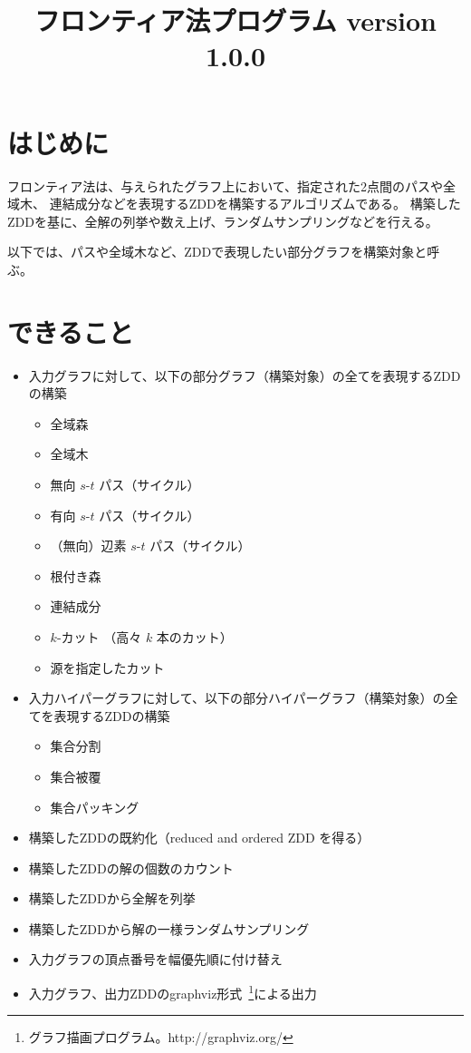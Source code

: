 \documentclass{jsarticle}
\title{フロンティア法プログラム version 1.0.0}
\begin{document}
\maketitle

\section{はじめに}

フロンティア法は、与えられたグラフ上において、指定された2点間のパスや全域木、
連結成分などを表現するZDDを構築するアルゴリズムである。
構築したZDDを基に、全解の列挙や数え上げ、ランダムサンプリングなどを行える。

以下では、パスや全域木など、ZDDで表現したい部分グラフを構築対象と呼ぶ。

\section{できること}

\begin{itemize}
\item 入力グラフに対して、以下の部分グラフ（構築対象）の全てを表現するZDDの構築
\begin{itemize}
\item 全域森
\item 全域木
\item 無向 $s$-$t$ パス（サイクル）
\item 有向 $s$-$t$ パス（サイクル）
\item （無向）辺素 $s$-$t$ パス（サイクル）
\item 根付き森
\item 連結成分
\item $k$-カット （高々 $k$ 本のカット）
\item 源を指定したカット
\end{itemize}
\item 入力ハイパーグラフに対して、以下の部分ハイパーグラフ（構築対象）の全てを表現するZDDの構築
\begin{itemize}
\item 集合分割
\item 集合被覆
\item 集合パッキング
\end{itemize}
\item 構築したZDDの既約化（reduced and ordered ZDD を得る）
\item 構築したZDDの解の個数のカウント
\item 構築したZDDから全解を列挙
\item 構築したZDDから解の一様ランダムサンプリング
\item 入力グラフの頂点番号を幅優先順に付け替え
\item 入力グラフ、出力ZDDのgraphviz形式~\footnote{グラフ描画プログラム。http://graphviz.org/}による出力
\end{itemize}
\end{document}
